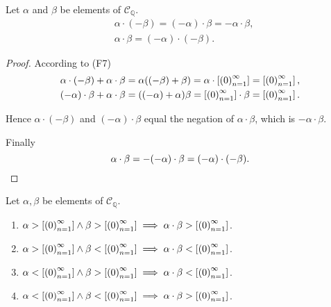 \begin{theorem}\label{theorem:chapter1:sign-and-multiplication-cauchy-sequence}
    Let $\alpha$ and $\beta$ be elements of $\mathscr{C}_{\mathbb{Q}}$.
    \[
        \begin{split}
            & \alpha\cdot(-\beta) = (-\alpha)\cdot\beta = -\alpha\cdot\beta, \\
            & \alpha\cdot\beta = (-\alpha)\cdot(-\beta).
        \end{split}
    \]
\end{theorem}

\begin{proof}
    According to (F7)
    \[
        \begin{split}
            \alpha\cdot(-\beta) + \alpha\cdot\beta = \alpha((-\beta) + \beta) = \alpha\cdot\left[{{\left({0}\right)}^{\infty}_{n=1}}\right] = \left[{{\left({0}\right)}^{\infty}_{n=1}}\right], \\
            (-\alpha)\cdot\beta + \alpha\cdot\beta = ((-\alpha) + \alpha)\beta = \left[{{\left({0}\right)}^{\infty}_{n=1}}\right]\cdot\beta = \left[{{\left({0}\right)}^{\infty}_{n=1}}\right].
        \end{split}
    \]

    Hence $\alpha\cdot(-\beta)$ and $(-\alpha)\cdot\beta$ equal the negation of $\alpha\cdot\beta$, which is $-\alpha\cdot\beta$.

    Finally
    \[
        \alpha\cdot\beta = -(-\alpha)\cdot\beta = (-\alpha)\cdot(-\beta).\qedhere
    \]
\end{proof}

\begin{theorem}
    Let $\alpha, \beta$ be elements of $\mathscr{C}_{\mathbb{Q}}$.
    \begin{enumerate}[label={(\roman*)}]
        \item $\alpha > \left[{{\left({0}\right)}^{\infty}_{n=1}}\right] \land \beta > \left[{{\left({0}\right)}^{\infty}_{n=1}}\right] \implies \alpha\cdot\beta > \left[{{\left({0}\right)}^{\infty}_{n=1}}\right]$.
        \item $\alpha > \left[{{\left({0}\right)}^{\infty}_{n=1}}\right] \land \beta < \left[{{\left({0}\right)}^{\infty}_{n=1}}\right] \implies \alpha\cdot\beta < \left[{{\left({0}\right)}^{\infty}_{n=1}}\right]$.
        \item $\alpha < \left[{{\left({0}\right)}^{\infty}_{n=1}}\right] \land \beta > \left[{{\left({0}\right)}^{\infty}_{n=1}}\right] \implies \alpha\cdot\beta < \left[{{\left({0}\right)}^{\infty}_{n=1}}\right]$.
        \item $\alpha < \left[{{\left({0}\right)}^{\infty}_{n=1}}\right] \land \beta < \left[{{\left({0}\right)}^{\infty}_{n=1}}\right] \implies \alpha\cdot\beta > \left[{{\left({0}\right)}^{\infty}_{n=1}}\right]$.
    \end{enumerate}
\end{theorem}

